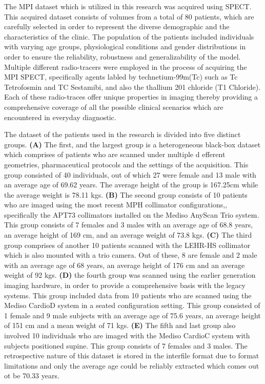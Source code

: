 The MPI dataset which is utilized in this research was acquired using SPECT. This acquired dataset consists of volumes from a total of 80 patients, which are carefully selected in order to represent the diverse demographic and the characteristics of the clinic. The population of the patients included individuals with varying age groups, physiological conditions and gender distributions in order to ensure the reliability, robustness and generalizability of the model. Multiple different radio-tracers were employed in the process of acquiring the MPI SPECT, specifically agents labled by technetium-99m(Tc) such as Tc Tetrofosmin and TC Sestamibi, and also the thallium 201 chloride (T1 Chloride). Each of these radio-traces offer unique properties in imaging thereby providing a comprehensive coverage of all the possible clinical scenarios which are encountered in everyday diagnostic. 

The dataset of the patients used in the research is divided into five distinct groups. \textbf{(A)} The first, and the largest group is a heterogeneous black-box dataset which comprises of patients who are scanned under multiple d efferent geometries, pharmaceutical protocols and the settings of the acquisition. This group consisted of 40 individuals, out of which 27 were female and 13 male with an average age of 69.62 years. The average height of the group is 167.25cm while the average weight is 78.11 kgs. \textbf{(B)} The second group consists of 10 patients who are imaged using the most recent MPH collimator configurations,, specifically the APT73 collimators installed on the Mediso AnyScan Trio system. This group consists of 7 females and 3 males with an average age of 68.8 years, an average height of 169 cm, and an average weight of 73.8 kgs. \textbf{(C)} The third group comprises of another 10 patients scanned with the LEHR-HS collimator which is also mounted with a trio camera. Out of these, 8 are female and 2 male with an average age of 68 years, an average height of 176 cm and an average weight of 92 kgs. \textbf{(D)} the fourth group was scanned using the earlier generation imaging hardware, in order to provide a comprehensive basis with the legacy systems. This group included data from 10 patients who are scanned using the Mediso CardioD system in a seated configuration setting. This group consisted of 1 female and 9 male subjects with an average age of 75.6 years, an average height of 151 cm and a mean weight of 71 kgs. \textbf{(E)} The fifth and last group also involved 10 individuals who are imaged with the Mediso CardioC system with subjects positioned supine. This group consists of 7 females and 3 males. The retrospective nature of this dataset is stored in the interfile format due to format limitations and only the average age could be reliably extracted which comes out ot be 70.33 years.

